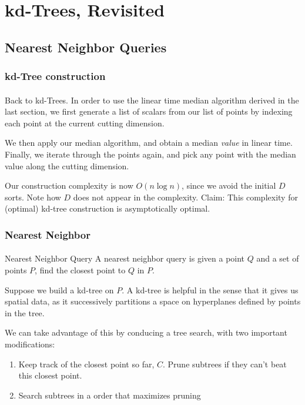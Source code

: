 \documentclass{beamer}                             %
\begin{document}
\section{kd-Trees, Revisited}
\subsection{Nearest Neighbor Queries}

\begin{frame}
\frametitle{kd-Tree construction}
\framesubtitle{}
Back to kd-Trees. In order to use the linear time median algorithm derived
in the last section, we first generate a list of scalars from our list of points
by indexing each point at the current cutting dimension.

We then apply our median algorithm, and obtain a median \textit{value} in linear
time. Finally, we iterate through the points again, and pick any point with the
median value along the cutting dimension. \pause

Our construction complexity is now \( O(n \log n) \), since we avoid
the initial \( D \) sorts. Note how \( D \) does not appear in the complexity.
Claim: This complexity for (optimal) kd-tree
construction is asymptotically optimal.
\end{frame}

\begin{frame}
\frametitle{Nearest Neighbor}
\framesubtitle{}
\begin{block}{Nearest Neighbor Query}
  A \alert{nearest neighbor query} is given a point \( Q \) and a set of points
  \( P \), find the closest point to \( Q \) in \( P \). \pause
\end{block}
Suppose we build a kd-tree on \( P \). A kd-tree is helpful in the sense that
it gives us spatial data, as it successively partitions a space on hyperplanes
defined by points in the tree. \pause

We can take advantage of this by conducing a tree search,
with two important modifications:
\begin{enumerate}
  \item Keep track of the closest point so far, \( C \).
    Prune subtrees if they can't beat this closest point.
  \item Search subtrees in a order that maximizes pruning
\end{enumerate}
\end{frame}
\end{document}
